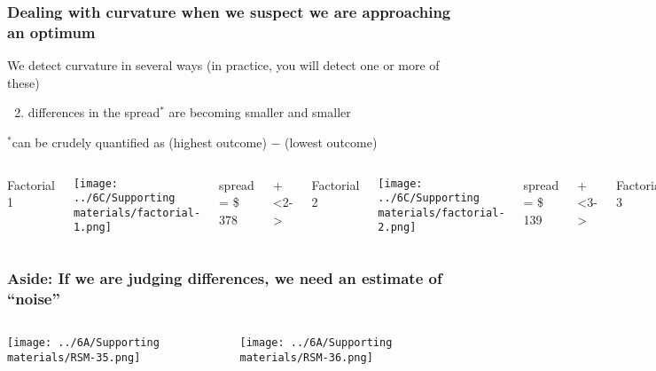 \begin{frame}\frametitle{Dealing with curvature when we suspect we are approaching an optimum}
	{\color{myOrange}We detect curvature in several ways (in practice, you will detect one or more of these)}
	
	\vspace{.7cm}
	\begin{enumerate}\setcounter{enumi}{1}
		\item	differences in the {\color{myGreen} spread}$^\ast$ are becoming smaller and smaller
	\end{enumerate}
	
	\vspace{.3cm}
	$^\ast${\color{myGreen}\scriptsize can be crudely quantified as (highest outcome) $-$ (lowest outcome)}
	\vspace{.5cm}
	\begin{columns}[T]
			Factorial 1
			
			\vspace{.5cm}
			\centerline{\texttt{[image: ../6C/Supporting materials/factorial-1.png]}}
			
			spread = \$ 378
		
			\onslide+<2->{
				Factorial 2 
			
				\vspace{.5cm}
				\centerline{\texttt{[image: ../6C/Supporting materials/factorial-2.png]}}
			
				spread = \$ 139
			}
			\onslide+<3->{
				Factorial 3
				
				\vspace{.5cm}
				\centerline{\texttt{[image: ../6C/Supporting materials/factorial-3.png]}}
			
				\vspace{0.4cm}
				spread = \$ 20
			}
	\end{columns}
	
\end{frame}

\begin{frame}\frametitle{{\color{red} Aside}: If we are judging differences, we need an estimate of ``noise''}
	\begin{columns}[T]
			\centerline{\texttt{[image: ../6A/Supporting materials/RSM-35.png]}}
			\centerline{\texttt{[image: ../6A/Supporting materials/RSM-36.png]}}
	\end{columns}	
\end{frame}

